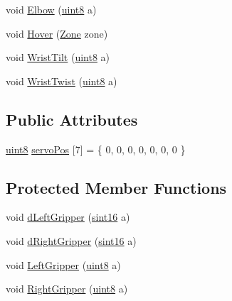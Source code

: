 \begin{DoxyCompactItemize}
\item 
void \hyperlink{classChipChipArray_1_1Arm_ac45149e03abfac230b75156bb42e8417}{Elbow} (\hyperlink{definitions_8hpp_adde6aaee8457bee49c2a92621fe22b79}{uint8} a)
\item 
void \hyperlink{classChipChipArray_1_1Arm_a8871580fd6a75fd60d99300f2b5c21d1}{Hover} (\hyperlink{definitions_8hpp_adbd1e7a33d3e1751c7b2aa2562d0ecb9}{Zone} zone)
\item 
void \hyperlink{classChipChipArray_1_1Arm_ad61f7c1e63eb09981b6c304bd924e217}{Wrist\+Tilt} (\hyperlink{definitions_8hpp_adde6aaee8457bee49c2a92621fe22b79}{uint8} a)
\item 
void \hyperlink{classChipChipArray_1_1Arm_a35ec7756840d9d32dcfbb88d831f087f}{Wrist\+Twist} (\hyperlink{definitions_8hpp_adde6aaee8457bee49c2a92621fe22b79}{uint8} a)
\end{DoxyCompactItemize}
\subsection*{Public Attributes}
\begin{DoxyCompactItemize}
\item 
\hyperlink{definitions_8hpp_adde6aaee8457bee49c2a92621fe22b79}{uint8} \hyperlink{classChipChipArray_1_1Arm_a9ddcea9544b6e2a4315b9dd705df8fdd}{servo\+Pos} \mbox{[}7\mbox{]} = \{ 0, 0, 0, 0, 0, 0, 0 \}
\end{DoxyCompactItemize}
\subsection*{Protected Member Functions}
\begin{DoxyCompactItemize}
\item 
void \hyperlink{classChipChipArray_1_1Arm_a6da0950c7e3bd4a31264e562916c032d}{d\+Left\+Gripper} (\hyperlink{definitions_8hpp_a74df79fde3c518e55b29ce6360a9c76e}{sint16} a)
\item 
void \hyperlink{classChipChipArray_1_1Arm_adfa7cc779b7ec3bf8453277796c142ed}{d\+Right\+Gripper} (\hyperlink{definitions_8hpp_a74df79fde3c518e55b29ce6360a9c76e}{sint16} a)
\item 
void \hyperlink{classChipChipArray_1_1Arm_a776eade3a7aaa6effaabad7f37c71031}{Left\+Gripper} (\hyperlink{definitions_8hpp_adde6aaee8457bee49c2a92621fe22b79}{uint8} a)
\item 
void \hyperlink{classChipChipArray_1_1Arm_a46a0b0cfb37cb0b663c91cd07e440e10}{Right\+Gripper} (\hyperlink{definitions_8hpp_adde6aaee8457bee49c2a92621fe22b79}{uint8} a)
\end{DoxyCompactItemize}



